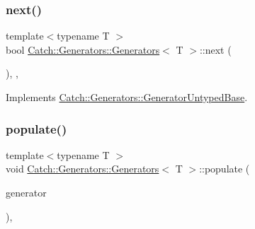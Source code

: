\subsubsection{\texorpdfstring{next()}{next()}}
{\footnotesize\ttfamily template$<$typename T $>$ \\
bool \mbox{\hyperlink{class_catch_1_1_generators_1_1_generators}{Catch\+::\+Generators\+::\+Generators}}$<$ T $>$\+::next (\begin{DoxyParamCaption}{ }\end{DoxyParamCaption})\hspace{0.3cm}{\ttfamily [inline]}, {\ttfamily [override]}, {\ttfamily [virtual]}}



Implements \mbox{\hyperlink{class_catch_1_1_generators_1_1_generator_untyped_base_aeed3c0cd6233c5f553549e453b8d6638}{Catch\+::\+Generators\+::\+Generator\+Untyped\+Base}}.

\mbox{\label{class_catch_1_1_generators_1_1_generators_a56e1b82d4c9c952076cd58efbf7a4572}} 
\subsubsection{\texorpdfstring{populate()}{populate()}\hspace{0.1cm}{\footnotesize\ttfamily [1/4]}}
{\footnotesize\ttfamily template$<$typename T $>$ \\
void \mbox{\hyperlink{class_catch_1_1_generators_1_1_generators}{Catch\+::\+Generators\+::\+Generators}}$<$ T $>$\+::populate (\begin{DoxyParamCaption}\item[{\mbox{\hyperlink{class_catch_1_1_generators_1_1_generator_wrapper}{Generator\+Wrapper}}$<$ T $>$ \&\&}]{generator }\end{DoxyParamCaption})\hspace{0.3cm}{\ttfamily [inline]}, {\ttfamily [private]}}

\mbox{\label{class_catch_1_1_generators_1_1_generators_ad708036fa5a9bf0cd1520ce111bc851d}} 
